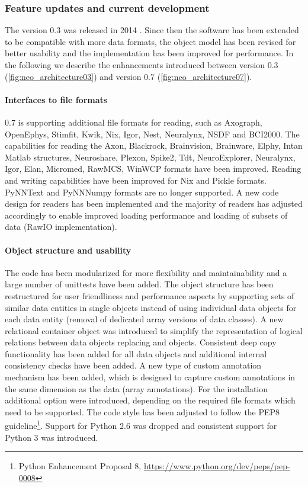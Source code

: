 \subsubsection{Feature updates and current development}
The  version 0.3 was released in 2014 \citep{Garcia_2014}. Since then the software has been extended to be compatible with more data formats, the object model has been revised for better usability and the implementation has been improved for performance. In the following we describe the enhancements introduced between version 0.3 (\cref{fig:neo_architecture03}) and version 0.7 (\cref{fig:neo_architecture07}).

\paragraph{Interfaces to file formats}
 0.7 is supporting additional file formats for reading, such as Axograph, OpenEphys, Stimfit, Kwik, Nix, Igor, Nest, Neuralynx, NSDF and BCI2000. The capabilities for reading the Axon, Blackrock, Brainvision, Brainware, Elphy, Intan Matlab structures, Neuroshare, Plexon, Spike2, Tdt, NeuroExplorer, Neuralynx, Igor, Elan, Micromed, RawMCS, WinWCP formats have been improved. Reading and writing capabilities have been improved for Nix and Pickle formats. PyNNText and PyNNNumpy formats are no longer supported. A new code design for readers has been implemented and the majority of readers has adjusted accordingly to enable improved loading performance and loading of subsets of data (RawIO implementation). 
\paragraph{Object structure and usability}
The code has been modularized for more flexibility and maintainability and a large number of unittests have been added. The object structure has been restructured for user friendliness and performance aspects by supporting sets of similar data entities in single objects instead of using individual data objects for each data entity (removal of dedicated array versions of data classes). A new relational container object  was introduced to simplify the representation of logical relations between data objects replacing  and  objects. Consistent deep copy functionality has been added for all data objects and additional internal consistency checks have been added. A new type of custom annotation mechanism has been added, which is designed to capture custom annotations in the same dimension as the data (array annotations). For the installation additional option were introduced, depending on the required file formats which need to be supported. The code style has been adjusted to follow the PEP8 guideline\footnote{Python Enhancement Proposal 8, \url{https://www.python.org/dev/peps/pep-0008}}\citep{PEP8StyleGuideforPythonCode_}. Support for Python 2.6 was dropped and consistent support for Python 3 was introduced.


